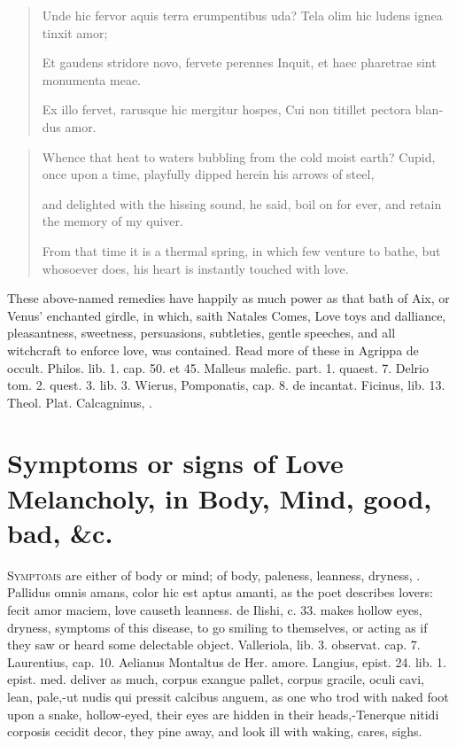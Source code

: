\begin{latin}
\begin{verse}
Unde hic fervor aquis terra erumpentibus uda?
Tela olim hic ludens ignea tinxit amor;

Et gaudens stridore novo, fervete perennes
Inquit, et haec pharetrae sint monumenta meae.

Ex illo fervet, rarusque hic mergitur hospes,
Cui non titillet pectora blandus amor.
\end{verse}
\end{latin}
\translationrule%
\begin{verse}%
Whence that heat to waters bubbling from the cold moist earth?
Cupid, once upon a time, playfully dipped herein his arrows of steel,

and delighted with the hissing sound, he said,
boil on for ever, and retain the memory of my quiver.

From that time it is a thermal spring, in which few venture to bathe,
but whosoever does, his heart is instantly touched with love.
\end{verse}%

These above-named remedies have happily as much power as that bath of
Aix, or Venus' enchanted girdle, in which, saith Natales Comes, Love
toys and dalliance, pleasantness, sweetness, persuasions, subtleties,
gentle speeches, and all witchcraft to enforce love, was contained.
Read more of these in Agrippa de occult. Philos. lib. 1. cap. 50. et
45. Malleus malefic. part. 1. quaest. 7. Delrio tom. 2. quest. 3. lib.
3. Wierus, Pomponatis, cap. 8. de incantat. Ficinus, lib. 13. Theol.
Plat. Calcagninus, \etc{}.


\section[Symptoms or signs of Love Melancholy]{Symptoms or signs of Love Melancholy, in Body, Mind, good, bad, \&c.}

\lettrine{S}{ymptoms} are either of body or mind; of body, paleness, leanness,
dryness, \etc{}. Pallidus omnis amans, color hic est aptus amanti, as
the poet describes lovers: fecit amor maciem, love causeth leanness.
 \Avicenna{} de Ilishi, c. 33. makes hollow eyes, dryness, symptoms
of this disease, to go smiling to themselves, or acting as if they saw
or heard some delectable object. Valleriola, lib. 3. observat. cap. 7.
Laurentius, cap. 10. Aelianus Montaltus de Her. amore. Langius, epist.
24. lib. 1. epist. med. deliver as much, corpus exangue pallet, corpus
gracile, oculi cavi, lean, pale,-ut nudis qui pressit calcibus anguem,
as one who trod with naked foot upon a snake, hollow-eyed, their eyes
are hidden in their heads,-Tenerque nitidi corposis cecidit
decor, they pine away, and look ill with waking, cares, sighs.

